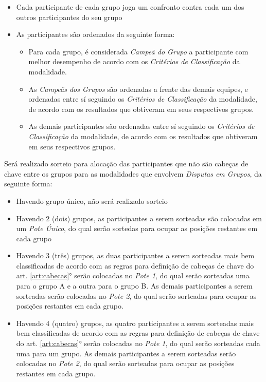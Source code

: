 \begin{itemize}[noitemsep]
	\item Cada participante de cada grupo joga um confronto contra cada um dos outros participantes do seu grupo
	\item As participantes são ordenados da seguinte forma:
	\begin{itemize}[noitemsep]
		\item Para cada grupo, é considerada \textit{Campeã do Grupo} a participante com melhor desempenho de acordo com os \textit{Critérios de Classificação} da modalidade.
		\item As \textit{Campeãs dos Grupos} são ordenadas a frente das demais equipes, e ordenadas entre sí seguindo os \textit{Critérios de Classificação} da modalidade, de acordo com os resultados que obtiveram em seus respectivos grupos.
		\item As demais participantes são ordenadas entre sí seguindo os \textit{Critérios de Classificação} da modalidade, de acordo com os resultados que obtiveram em seus respectivos grupos.
	\end{itemize}
\end{itemize}

\noindent
\noindent
Será realizado sorteio para alocação das participantes que não são cabeças de chave entre os grupos para as modalidades que envolvem \textit{Disputas em Grupos}, da seguinte forma:
\begin{itemize}[noitemsep]
	\item Havendo grupo único, não será realizado sorteio
	\item Havendo 2 (dois) grupos, as participantes a serem sorteadas são colocadas em um \textit{Pote Único}, do qual serão sortedas para ocupar as posições restantes em cada grupo
	\item Havendo 3 (três) grupos, as duas participantes a serem sorteadas mais bem classificadas de acordo com as regras para definição de cabeças de chave do art. \ref{art:cabecas}° serão colocadas no \textit{Pote 1}, do qual serão sorteadas uma para o grupo A e a outra para o grupo B. As demais participantes a serem sorteadas serão colocadas no \textit{Pote 2}, do qual serão sorteadas para ocupar as posições restantes em cada grupo.
	\item Havendo 4 (quatro) grupos, as quatro participantes a serem sorteadas mais bem classificadas de acordo com as regras para definição de cabeças de chave do art. \ref{art:cabecas}° serão colocadas no \textit{Pote 1}, do qual serão sorteadas cada uma para um grupo. As demais participantes a serem sorteadas serão colocadas no \textit{Pote 2}, do qual serão sorteadas para ocupar as posições restantes em cada grupo.
\end{itemize}


